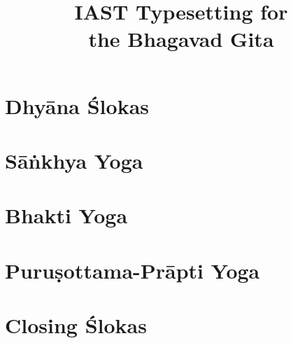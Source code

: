 \documentclass{scrbook}
\title{IAST Typesetting for \\ the Bhagavad Gita}
\author{}
\begin{document}
\maketitle
\frontmatter

\tableofcontents
\newpage

\chapter{Dhyāna Ślokas}


\mainmatter
\setcounter{chapter}{1}

\chapter{Sāṅkhya Yoga}
\begin{multicols}{2}
    
\end{multicols}

\setcounter{chapter}{11}

\chapter{Bhakti Yoga}
\begin{multicols}{2}
    
\end{multicols}

\setcounter{chapter}{14}

\chapter{Puruṣottama-Prāpti Yoga}
\begin{multicols}{2}
    
\end{multicols}

\backmatter
\chapter{Closing Ślokas}

\end{document}
